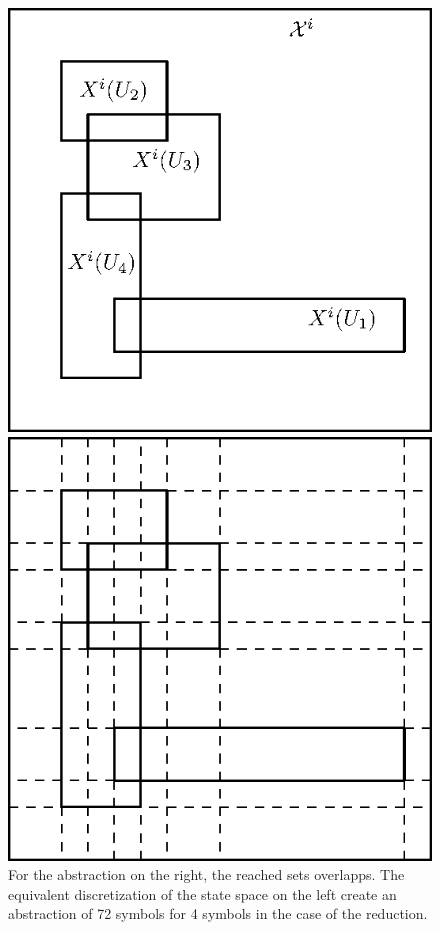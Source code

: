 \begin{figure}
\centering
\begin{minipage}[b]{0.49\textwidth}
	\includegraphics[width=\textwidth]{chapters/abstraction_reduction/overlapp_disc.eps}
\end{minipage}	
\begin{minipage}[b]{0.49\textwidth}
	\includegraphics[width=\textwidth]{chapters/abstraction_reduction/overlapp_disc2.eps}
\end{minipage}	
\caption{For the abstraction on the right, the reached sets overlapps. The equivalent discretization of the state space on the left create an abstraction of 72 symbols for 4 symbols in the case of the reduction.}
\end{figure}

